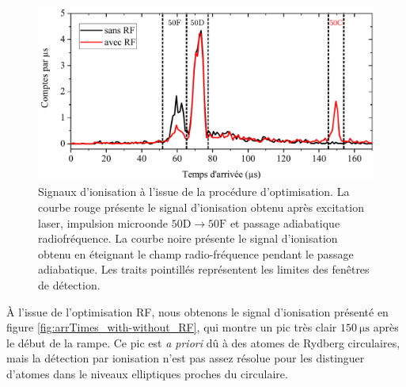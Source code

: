 %
\begin{figure}[!h]
\centering
\includegraphics[width=0.85\linewidth]{figures/circulars/arrTimes_with-without_RF}
\caption[Signaux d'ionisation des atomes circulaires]{
Signaux d'ionisation à l'issue de la procédure d'optimisation.
La courbe rouge présente le signal d'ionisation obtenu après excitation laser, impulsion microonde $\mathrm{50D \rightarrow 50F}$ et passage adiabatique radiofréquence.
La courbe noire présente le signal d'ionisation obtenu en éteignant le champ radio-fréquence pendant le passage adiabatique.
Les traits pointillés représentent les limites des fenêtres de détection.
}
\label{fig:arrTimes_with-without_RF}
\end{figure}
%
\`A l'issue de l'optimisation RF, nous obtenons le signal d'ionisation présenté en figure \eqref{fig:arrTimes_with-without_RF}, qui montre un pic très clair $\SI{150}{\us}$ après le début de la rampe.
Ce pic est \textit{a priori} dû à des atomes de Rydberg circulaires, mais la détection par ionisation n'est pas assez résolue pour les distinguer d'atomes dans le niveaux elliptiques proches du circulaire.

